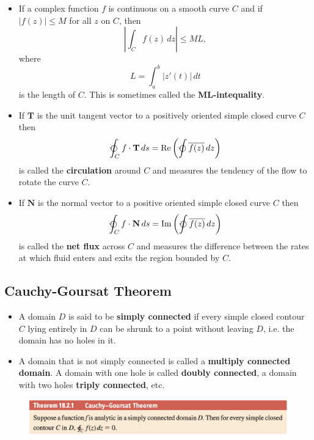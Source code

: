 \documentclass{article}
\renewcommand{\Im}{\operatorname{Im}}
\renewcommand{\Re}{\operatorname{Re}}
\renewcommand{\vec}[1]{\boldsymbol{\mathbf{#1}}}
\begin{document}
\begin{itemize}
  \item If a complex function $f$ is continuous on a smooth curve $C$ and if $|f(z)| \le M$ for all $z$ on $C$, then \[\left| \int_C f(z) \,d z \right| \le M L,\] where \[L = \int_a^b |z'(t)| \,d t\] is the length of $C$. This is sometimes called the \textbf{ML-intequality}.

  \item If $\vec{T}$ is the unit tangent vector to a positively oriented simple closed curve $C$ then \[\varointctrclockwise_C f \cdot \vec{T} \,d s = \Re \left( \varointctrclockwise \overline{f(z)} \,d z \right)\] is called the \textbf{circulation} around $C$ and measures the tendency of the flow to rotate the curve $C$.

  \item If $\vec{N}$ is the normal vector to a positive oriented simple closed curve $C$ then \[\varointctrclockwise_C f \cdot \vec{N} \,d s = \Im \left( \varointctrclockwise \overline{f(z)} \,d z \right)\] is called the \textbf{net flux} across $C$ and measures the difference between the rates at which fluid enters and exits the region bounded by $C$.
\end{itemize}

\subsection{Cauchy-Goursat Theorem}

\begin{itemize}
  \item A domain $D$ is said to be \textbf{simply connected} if every simple closed contour $C$ lying entirely in $D$ can be shrunk to a point without leaving $D$, i.e. the domain has no holes in it.

  \item A domain that is not simply connected is called a \textbf{multiply connected domain}. A domain with one hole is called \textbf{doubly connected}, a domain with two holes \textbf{triply connected}, etc.
\end{itemize}

\begin{figure}[H]
  \centering
  \includegraphics[width=\textwidth]{cauchy-goursat-theorem}
\end{figure}
\end{document}
